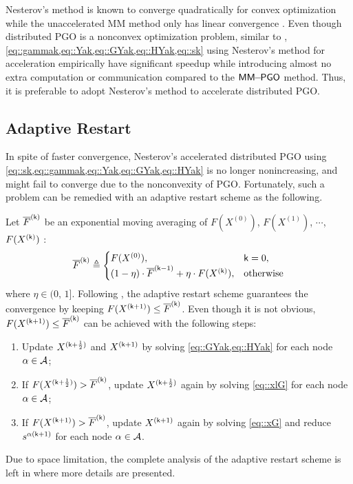 Nesterov's method is known to converge quadratically for convex optimization while the unaccelerated MM method only has linear convergence  \cite{nesterov1983method,nesterov2013introductory}. Even though distributed PGO is a nonconvex optimization problem, similar to \cite{fan2019proximal,fan2020mm},  \cref{eq::gammak,eq::Yak,eq::GYak,eq::HYak,eq::sk} using  Nesterov's method for acceleration  empirically have significant speedup while introducing  almost no extra computation or communication compared to the $\mm$ method. Thus, it is preferable to adopt Nesterov's method to accelerate distributed PGO.

\vspace{-0.5em}
\subsection{Adaptive Restart}\label{section::ammc::adaptive}
In spite of faster convergence, Nesterov's accelerated distributed PGO using \cref{eq::sk,eq::gammak,eq::Yak,eq::GYak,eq::HYak} is no longer nonincreasing, and might fail to converge due to the nonconvexity of PGO. Fortunately, such a problem can be remedied with an adaptive restart scheme \cite{o2015adaptive,fan2020mm,fan2019proximal} as the following.

Let $\sF^{(\sk)}$ be an exponential moving averaging of $F(X^{(0)})$, $F(X^{(1)})$, $\cdots$, $F(\Xk)$ :
\begin{equation}\label{eq::lFk}
	\sF^{(\sk)}\triangleq \begin{cases}
		F(X^{(0)}),& \sk=0,\\
		(1-\eta)\cdot\sF^{(\skm)}+\eta\cdot F(\Xk),&\text{otherwise}
	\end{cases}
\end{equation}
where $\eta\in(0,\,1]$.  {\highlight Following \cite{fan2019proximal,li2015accelerated,zhang2004nonmonotone}, the adaptive restart scheme guarantees the convergence by keeping $F(\Xkp)\leq \lF^{(\sk)}$. Even though it is not obvious, $F(\Xkp)\leq \lF^{(\sk)}$  can be achieved with the following steps}:
\begin{enumerate}[leftmargin=0.45cm]
\item  Update $\Xkh$ and $\Xkp$ by solving \cref{eq::GYak,eq::HYak} for each node $\alpha\in\AA$;
\item If $F(\Xkh)>\sF^{(\sk)}$, update $\Xkh$ again by solving  \cref{eq::xlG} for each node $\alpha\in\AA$;
\item If $F(\Xkp)>\sF^{(\sk)}$, update $\Xkp$ again by solving  \cref{eq::xG}  and reduce $s^{\akp}$  for each node $\alpha\in\AA$.  
\end{enumerate}
{\highlight Due to space limitation, the complete analysis of the adaptive restart scheme  is left in   where more details are presented.}

